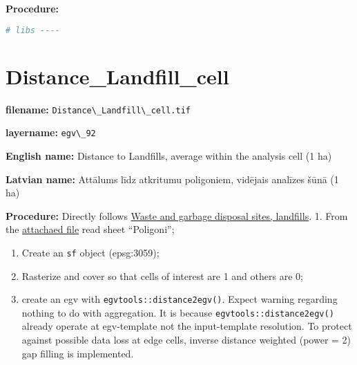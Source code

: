 \documentclass[
]{book}
\newcommand{\passthrough}[1]{#1}
\begin{document}
\textbf{Procedure:}

\begin{lstlisting}[language=R]
# libs ----
\end{lstlisting}

\section{Distance\_Landfill\_cell}\label{ch06.092}

\textbf{filename:} \passthrough{\lstinline!Distance\_Landfill\_cell.tif!}

\textbf{layername:} \passthrough{\lstinline!egv\_92!}

\textbf{English name:} Distance to Landfills, average within the analysis cell (1 ha)

\textbf{Latvian name:} Attālums līdz atkritumu poligoniem, vidējais analīzes šūnā (1 ha)

\textbf{Procedure:} Directly follows \hyperref[Ch04.14]{Waste and garbage disposal sites, landfills}.
1. From the \href{https://github.com/aavotins/HiQBioDiv_EGVs/blob/main/Data/Geodata/2024/GarbageWasteLandfills/Atkritumi.xlsx}{attachaed file} read sheet ``Poligoni'';

\begin{enumerate}
\def\labelenumi{\arabic{enumi}.}
\setcounter{enumi}{1}
\item
  Create an \passthrough{\lstinline!sf!} object (epsg:3059);
\item
  Rasterize and cover so that cells of interest are 1 and others are 0;
\item
  create an egv with \passthrough{\lstinline!egvtools::distance2egv()!}. Expect warning regarding nothing
  to do with aggregation. It is because \passthrough{\lstinline!egvtools::distance2egv()!} already operate at
  egv-template not the input-template resolution. To protect against possible data loss at edge cells,
  inverse distance weighted (power = 2) gap filling is implemented.
\end{enumerate}
\end{document}
